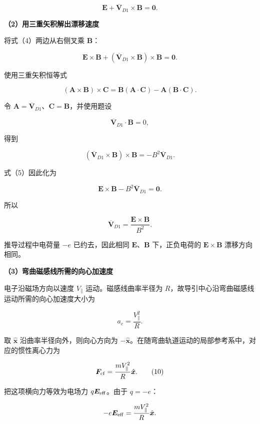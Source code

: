 \documentclass[12pt,a4paper,UTF8]{ctexart}
\begin{document}
\[
\boldsymbol E+\overline{\boldsymbol V}_{D1}\times\boldsymbol B
=\boldsymbol 0.
\tag{4}
\]

\textbf{（2）用三重矢积解出漂移速度}

将式（4）两边从右侧叉乘 \(\boldsymbol B\)：

\[
\boldsymbol E\times\boldsymbol B
+\left(
\overline{\boldsymbol V}_{D1}\times\boldsymbol B
\right)\times\boldsymbol B
=\boldsymbol 0.
\tag{5}
\]

使用三重矢积恒等式

\[
(\boldsymbol A\times\boldsymbol B)\times\boldsymbol C
=\boldsymbol B(\boldsymbol A\cdot\boldsymbol C)
-\boldsymbol A(\boldsymbol B\cdot\boldsymbol C).
\tag{6}
\]

令
\(\boldsymbol A=\overline{\boldsymbol V}_{D1}\)、\(\boldsymbol C=\boldsymbol B\)，并使用题设

\[
\overline{\boldsymbol V}_{D1}\cdot\boldsymbol B=0,
\]

得到

\[
\left(
\overline{\boldsymbol V}_{D1}\times\boldsymbol B
\right)\times\boldsymbol B
=-B^2\overline{\boldsymbol V}_{D1}.
\tag{7}
\]

式（5）因此化为

\[
\boldsymbol E\times\boldsymbol B
-B^2\overline{\boldsymbol V}_{D1}=\boldsymbol 0.
\]

所以

\[
\boxed{
\overline{\boldsymbol V}_{D1}
=\frac{\boldsymbol E\times\boldsymbol B}{B^2}
}.
\tag{8}
\]

推导过程中电荷量 \(-e\) 已约去，因此相同
\(\boldsymbol E\)、\(\boldsymbol B\) 下，正负电荷的
\(\boldsymbol E\times\boldsymbol B\) 漂移方向相同。

\textbf{（3）弯曲磁感线所需的向心加速度}

电子沿磁场方向以速度 \(V_{\parallel}\) 运动。磁感线曲率半径为
\(R\)，故导引中心沿弯曲磁感线运动所需的向心加速度大小为

\[
a_c=\frac{V_{\parallel}^2}{R}.
\tag{9}
\]

取 \(\hat{\boldsymbol x}\) 沿曲率半径向外，则向心方向为
\(-\hat{\boldsymbol x}\)。在随弯曲轨道运动的局部参考系中，对应的惯性离心力为

\[
\boldsymbol F_{\rm cf}
=\frac{mV_{\parallel}^2}{R}
\hat{\boldsymbol x}.
\tag{10}
\]

把这项横向力等效为电场力 \(q\boldsymbol E_{\rm eff}\)。由于 \(q=-e\)：

\[
-e\boldsymbol E_{\rm eff}
=\frac{mV_{\parallel}^2}{R}
\hat{\boldsymbol x}.
\]
\end{document}
